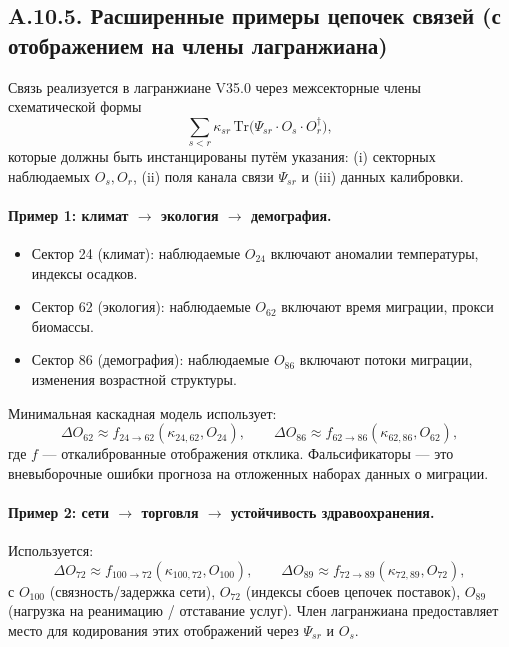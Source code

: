 \documentclass[11pt,a4paper]{article}
\begin{document}
	\subsection*{A.10.5. Расширенные примеры цепочек связей (с отображением на члены лагранжиана)}
	
	Связь реализуется в лагранжиане V35.0 через межсекторные члены схематической формы
	$$
	\sum_{s<r}\kappa_{sr}\,\mathrm{Tr}\!\big(\Psi_{sr}\cdot O_s\cdot O_r^\dagger\big),
	$$
	которые должны быть инстанцированы путём указания: (i) секторных наблюдаемых $O_s,O_r$, (ii) поля канала связи $\Psi_{sr}$ и (iii) данных калибровки.
	
	\paragraph{Пример 1: климат $\rightarrow$ экология $\rightarrow$ демография.}
	\begin{itemize}[leftmargin=*]
		\item Сектор 24 (климат): наблюдаемые $O_{24}$ включают аномалии температуры, индексы осадков.
		\item Сектор 62 (экология): наблюдаемые $O_{62}$ включают время миграции, прокси биомассы.
		\item Сектор 86 (демография): наблюдаемые $O_{86}$ включают потоки миграции, изменения возрастной структуры.
	\end{itemize}
	Минимальная каскадная модель использует:
	$$
	\Delta O_{62}\approx f_{24\to62}(\kappa_{24,62},O_{24}),\qquad
	\Delta O_{86}\approx f_{62\to86}(\kappa_{62,86},O_{62}),
	$$
	где $f$ — откалиброванные отображения отклика. Фальсификаторы — это вневыборочные ошибки прогноза на отложенных наборах данных о миграции.
	
	\paragraph{Пример 2: сети $\rightarrow$ торговля $\rightarrow$ устойчивость здравоохранения.}
	Используется:
	$$
	\Delta O_{72}\approx f_{100\to72}(\kappa_{100,72},O_{100}),\qquad
	\Delta O_{89}\approx f_{72\to89}(\kappa_{72,89},O_{72}),
	$$
	с $O_{100}$ (связность/задержка сети), $O_{72}$ (индексы сбоев цепочек поставок), $O_{89}$ (нагрузка на реанимацию / отставание услуг). Член лагранжиана предоставляет место для кодирования этих отображений через $\Psi_{sr}$ и $O_s$.
	
\end{document}
